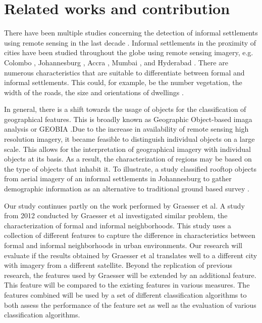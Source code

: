 \section{Related works and contribution}

There have been multiple studies concerning the detection of informal
settlements using remote sensing in the last decade \cite{kuffer2016slums}.
Informal settlements in the proximity of cities have been studied throughout
the globe using remote sensing imagery, e.g. Colombo \cite{colombo},
Johannesburg \cite{williams2016automatic}, Accra \cite{accra}, Mumbai
\cite{mumbai}, and Hyderabad \cite{hyderabad}. There are numerous
characteristics that are suitable to differentiate between formal and informal
settlements. This could, for example,  be the number vegetation, the width of
the roads, the size and orientations of dwellings \cite{owen2013approach}.

In general, there is a shift towards the usage of objects for the
classification of geographical features. This is broadly known as Geographic
Object-based imaga analysis or GEOBIA \cite{hay2008geographic}.Due to the
increase in availability of remote sensing high resolution imagery, it became
feasible to distinguish individual objects on a large scale.  This allows for
the interpretation of geographical imagery with individual objects at its
basis.  As a result, the characterization of regions may be based on the type
of objects that inhabit it.  To illustrate, a study classified rooftop objects
from aerial imagery of an informal settlements in Johannesburg to gather
demographic information as an alternative to traditional ground based survey
\cite{williams2016automatic}.


Our study continues partly on the work performed by Graesser et al.  A study
from 2012 conducted by Graesser et al  investigated similar
problem, the characterization of formal and informal neighborhoods.  This study
uses a collection of different features to capture the difference in
characteristics between formal and informal neighborhoods in urban
environments. Our research will evaluate if the results obtained by Graesser et
al translates well to a different city with imagery from a different
satellite. Beyond the replication of previous research, the features used by
Graesser will be extended by an additional feature. This feature will be
compared to the existing features in various measures. The features combined
will be used by a set of different classification algorithms to both assess the
performance of the feature set as well as the evaluation of various
classification algorithms.


